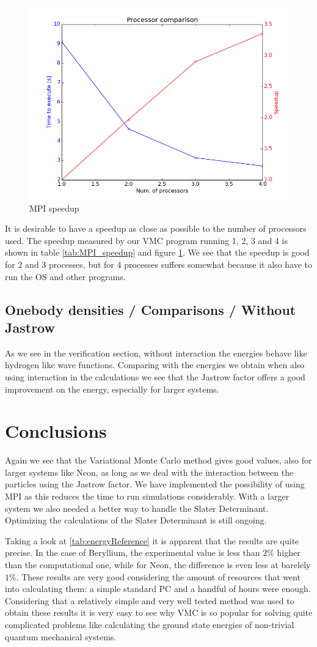 \documentclass[11pt]{article}
\begin{document}
		\begin{figure}
		\centering \includegraphics[width=0.45\linewidth]{figures/processor_number_time_comparison}
		\protect\caption{MPI speedup}
		\label{fig:MPI_speedup}
		\end{figure}

		It is desirable to have a speedup as close as possible to the number of processors used. The speedup measured by our VMC program running 1, 2, 3 and 4 is shown in table \ref{tab:MPI_speedup} and figure \ref{fig:MPI_speedup}. We see that the speedup is good for 2 and 3 processes, but for 4 processes suffers somewhat because it also have to run the OS and other programs.

	\subsection{Onebody densities / Comparisons / Without Jastrow}
		As we see in the verification section, without interaction the energies behave like hydrogen like wave functions. Comparing with the energies we obtain when also using interaction in the calculations we see that the Jastrow factor offers a good improvement on the energy, especially for larger systems.

\section{Conclusions}
	Again we see that the Variational Monte Carlo method gives good values, also for larger systems like Neon, as long as we deal with the interaction between the particles using the Jastrow factor. We have implemented the possibility of using MPI as this reduces the time to run simulations considerably. With a larger system we also needed a better way to handle the Slater Determinant. Optimizing the calculations of the Slater Determinant is still ongoing.

	Taking a look at \ref{tab:energyReference} it is apparent that the results are quite precise. In the case of Beryllium, the experimental value is less than $2\%$ higher than the computational one, while for Neon, the difference is even less at barelely $1\%$. These results are very good considering the amount of resources that went into calculating them: a simple standard PC and a handful of hours were enough. Considering that a relatively simple and very well tested method was used to obtain these results it is very easy to see why VMC is so popular for solving quite complicated problems like calculating the ground state energies of non-trivial quantum mechanical systems.




\end{document}
